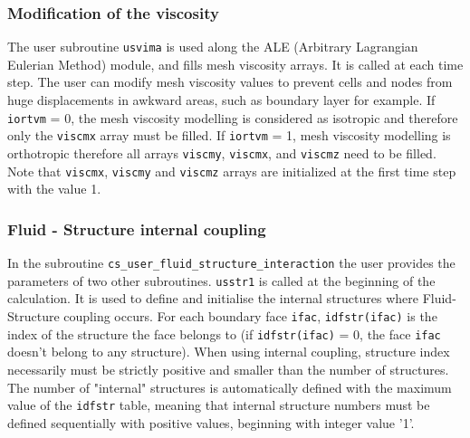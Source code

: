 {%
\subsubsection{Modification of the viscosity}

The user subroutine \texttt{usvima} is used along the ALE (Arbitrary Lagrangian Eulerian
 Method) module, and fills mesh viscosity arrays. It is called at each time step.
The user can modify mesh viscosity values to prevent cells and nodes from huge
 displacements in awkward areas, such as boundary layer for example.
If \texttt{iortvm} = 0, the mesh viscosity modelling is considered as isotropic and
 therefore only the \texttt{viscmx} array must be filled.
If \texttt{iortvm} = 1, mesh viscosity modelling is orthotropic therefore all arrays
 \texttt{viscmy}, \texttt{viscmx}, and \texttt{viscmz} need to be filled.
Note that \texttt{viscmx}, \texttt{viscmy} and \texttt{viscmz} arrays are initialized
 at the first time step with the value 1.

\subsubsection{Fluid - Structure internal coupling}\label{sec:ALE}

In the subroutine \texttt{cs\_user\_fluid\_structure\_interaction} the user provides the parameters of two other subroutines.
\texttt{usstr1} is called at the beginning of the calculation. It is used to define
 and initialise the internal structures where Fluid-Structure coupling occurs.
For each boundary face \texttt{ifac}, \texttt{idfstr(ifac)} is the index of the structure
 the face belongs to (if \texttt{idfstr(ifac)} = 0, the face \texttt{ifac} doesn't belong
 to any structure). When using internal coupling, structure index necessarily must be
 strictly positive and smaller than the number of structures. The number of "internal" structures is automatically defined with the maximum
 value of the \texttt{idfstr} table, meaning that internal structure numbers must be defined
 sequentially with positive values, beginning with integer value '1'.

}
